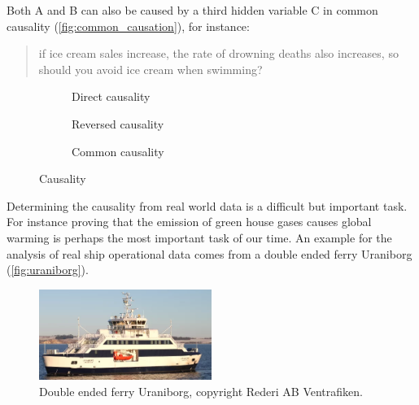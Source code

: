 \documentclass[fleqn,10pt]{olplainarticle}
\begin{document}
\noindent Both A and B can also be caused by a third hidden variable C in common causality (\autoref{fig:common_causation}), for instance:
\begin{quote}
if ice cream sales increase, the rate of drowning deaths also increases, so should you avoid ice cream when swimming? 
\end{quote}
\begin{figure}[!htb]
    \begin{subfigure}[b]{0.3\textwidth}
        \centering
        \caption{Direct causality}
        \label{fig:direct_causation}
    \end{subfigure}
    \hfill
    \begin{subfigure}[b]{0.3\textwidth}
        \centering
        \caption{Reversed causality}
        \label{fig:reversed_causation}
    \end{subfigure}
    \hfill
    \begin{subfigure}[b]{0.3\textwidth}
        \centering
        \caption{Common causality}
        \label{fig:common_causation}
    \end{subfigure}
    \caption{Causality}
    \label{fig:causal_relationships}
    
\end{figure}
Determining the causality from real world data is a difficult but important task. For instance proving that the emission of green house gases causes global warming is perhaps the most important task of our time. 
An example for the analysis of real ship operational data comes from a double ended ferry Uraniborg (\autoref{fig:uraniborg}). 
\begin{figure}[!htb]
    \centering
    \includegraphics[width=0.5\textwidth]{figures/uraniborg.png}
    \caption{Double ended ferry Uraniborg, copyright Rederi AB Ventrafiken.}
    \label{fig:uraniborg}
\end{figure}
\end{document}
